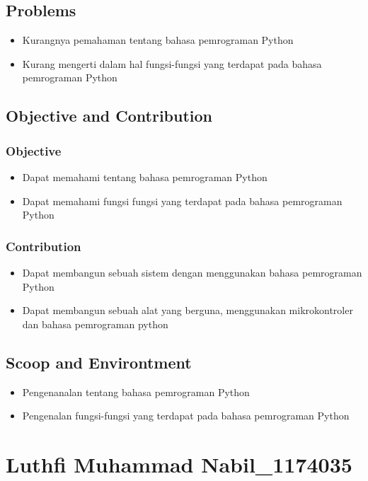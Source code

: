 	\subsection{Problems}
		\begin{itemize}
			\item Kurangnya pemahaman tentang bahasa pemrograman Python
			\item Kurang mengerti dalam hal fungsi-fungsi yang terdapat pada bahasa pemrograman Python
		\end{itemize}

	\subsection{Objective and Contribution}
		\subsubsection{Objective}
			\begin{itemize}
				\item Dapat memahami tentang bahasa pemrograman Python
				\item Dapat memahami fungsi fungsi yang terdapat pada bahasa pemrograman Python
			\end{itemize}
	
		\subsubsection{Contribution}
			\begin{itemize}
				\item Dapat membangun sebuah sistem dengan menggunakan bahasa pemrograman Python
				\item Dapat membangun sebuah alat yang berguna, menggunakan mikrokontroler dan bahasa pemrograman python
			\end{itemize}

	\subsection{Scoop and Environtment}
		\begin{itemize}
			\item Pengenanalan tentang bahasa pemrograman Python
			\item Pengenalan fungsi-fungsi yang terdapat pada bahasa pemrograman Python
		\end{itemize}

\section{Luthfi Muhammad Nabil\_1174035}
